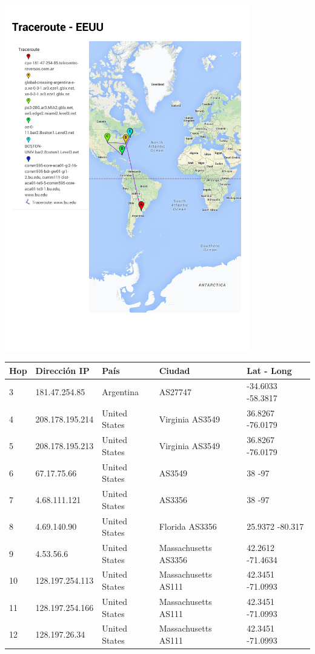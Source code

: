 \centerline{\includegraphics[width=0.8\textwidth]{mapas/EEUU}}


\begin{center}
 \begin{tabular}{|l|l|l|l|l|}
    \hline
    Hop &Dirección IP &País &Ciudad &Lat - Long \\ \hline \hline
    3 & 181.47.254.85 & Argentina  & AS27747 & -34.6033 -58.3817 \\ \hline
    4 & 208.178.195.214 & United States & Virginia AS3549 & 36.8267 -76.0179 \\ \hline
    5 & 208.178.195.213 & United States & Virginia AS3549 & 36.8267 -76.0179 \\ \hline
    6 & 67.17.75.66 & United States  & AS3549 & 38 -97 \\ \hline
    7 & 4.68.111.121 & United States  & AS3356 & 38 -97 \\ \hline
    8 & 4.69.140.90 & United States & Florida AS3356 & 25.9372 -80.317 \\ \hline
    9 & 4.53.56.6 & United States & Massachusetts AS3356 & 42.2612 -71.4634 \\ \hline
    10 & 128.197.254.113 & United States & Massachusetts AS111 & 42.3451 -71.0993 \\ \hline
    11 & 128.197.254.166 & United States & Massachusetts AS111 & 42.3451 -71.0993 \\ \hline
    12 & 128.197.26.34 & United States & Massachusetts AS111 & 42.3451 -71.0993 \\ \hline
 \end{tabular}
\end{center}


